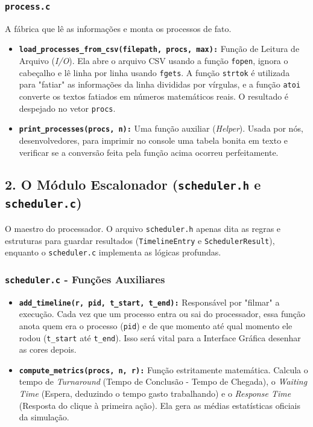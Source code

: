 \documentclass[12pt,a4paper]{article}
\begin{document}
\begin{itemize}
{\subsubsection{\texttt{process.c}}
A fábrica que lê as informações e monta os processos de fato.
\begin{itemize}
    \item \textbf{\texttt{load\_processes\_from\_csv(filepath, procs, max):}} Função de Leitura de Arquivo (\textit{I/O}). Ela abre o arquivo CSV usando a função \texttt{fopen}, ignora o cabeçalho e lê linha por linha usando \texttt{fgets}. A função \texttt{strtok} é utilizada para "fatiar" as informações da linha divididas por vírgulas, e a função \texttt{atoi} converte os textos fatiados em números matemáticos reais. O resultado é despejado no vetor \texttt{procs}.
    \item \textbf{\texttt{print\_processes(procs, n):}} Uma função auxiliar (\textit{Helper}). Usada por nós, desenvolvedores, para imprimir no console uma tabela bonita em texto e verificar se a conversão feita pela função acima ocorreu perfeitamente.
\end{itemize}

\subsection{2. O Módulo Escalonador (\texttt{scheduler.h} e \texttt{scheduler.c})}
O maestro do processador. O arquivo \texttt{scheduler.h} apenas dita as regras e estruturas para guardar resultados (\texttt{TimelineEntry} e \texttt{SchedulerResult}), enquanto o \texttt{scheduler.c} implementa as lógicas profundas.

\subsubsection{\texttt{scheduler.c} - Funções Auxiliares}
\begin{itemize}
    \item \textbf{\texttt{add\_timeline(r, pid, t\_start, t\_end):}} Responsável por "filmar" a execução. Cada vez que um processo entra ou sai do processador, essa função anota quem era o processo (\texttt{pid}) e de que momento até qual momento ele rodou (\texttt{t\_start} até \texttt{t\_end}). Isso será vital para a Interface Gráfica desenhar as cores depois.
    \item \textbf{\texttt{compute\_metrics(procs, n, r):}} Função estritamente matemática. Calcula o tempo de \textit{Turnaround} (Tempo de Conclusão - Tempo de Chegada), o \textit{Waiting Time} (Espera, deduzindo o tempo gasto trabalhando) e o \textit{Response Time} (Resposta do clique à primeira ação). Ela gera as médias estatísticas oficiais da simulação.
\end{itemize}

}
\end{itemize}
\end{document}
